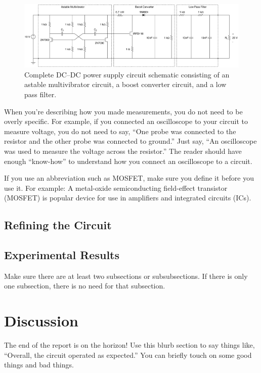 \documentclass[11pt]{article}
\begin{document}
\begin{figure}[ht]
\centering
\includegraphics[width=6.5in]{dcdc}
\caption{Complete DC--DC power supply circuit schematic consisting of an astable multivibrator circuit, a boost converter circuit, and a low pass filter.}
\label{powersupply}
\end{figure}

When you’re describing how you made measurements, you do not need to be overly specific. For example, if you connected an oscilloscope to your circuit to measure voltage, you do not need to say, “One probe was connected to the resistor and the other probe was connected to ground.” Just say, “An oscilloscope was used to measure the voltage across the resistor.” The reader should have enough “know-how” to understand how you connect an oscilloscope to a circuit.

If you use an abbreviation such as MOSFET, make sure you define it before you use it. For example: A metal-oxide semiconducting field-effect transistor (MOSFET) is popular device for use in amplifiers and integrated circuits (ICs).

\subsection{Refining the Circuit}

\subsection{Experimental Results}

Make sure there are at least two subsections or subsubsections. If there is only one subsection, there is no need for that subsection.  
	
\section{Discussion}
\label{dis_section}

The end of the report is on the horizon! Use this blurb section to say things like, “Overall, the circuit operated as expected.” You can briefly touch on some good things and bad things.
\end{document}
